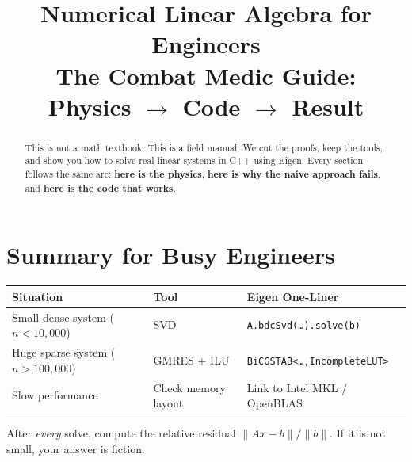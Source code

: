 \documentclass[11pt,letterpaper]{article}
\title{\textbf{Numerical Linear Algebra for Engineers}\\[6pt]
       \large The Combat Medic Guide:\\
       Physics $\rightarrow$ Code $\rightarrow$ Result}
\author{}
\date{}
\theoremstyle{definition}
\theoremstyle{remark}
\begin{document}
\maketitle
\thispagestyle{empty}

\begin{abstract}
This is not a math textbook. This is a field manual. We cut the proofs, keep the
tools, and show you how to solve real linear systems in C++ using Eigen. Every
section follows the same arc: \textbf{here is the physics}, \textbf{here is why
the naive approach fails}, and \textbf{here is the code that works}.
\end{abstract}

\tableofcontents
\newpage









\section{Summary for Busy Engineers}

\begin{center}
\renewcommand{\arraystretch}{1.4}
\begin{tabular}{@{}lll@{}}
\toprule
\textbf{Situation} & \textbf{Tool} & \textbf{Eigen One-Liner} \\
\midrule
Small dense system ($n < 10{,}000$)
    & SVD
    & \texttt{A.bdcSvd(\ldots).solve(b)} \\
Huge sparse system ($n > 100{,}000$)
    & GMRES + ILU
    & \texttt{BiCGSTAB<\ldots,IncompleteLUT>} \\
Slow performance
    & Check memory layout
    & Link to Intel MKL / OpenBLAS \\
\bottomrule
\end{tabular}
\end{center}

\begin{tipbox}
After \emph{every} solve, compute the relative residual
$\|Ax - b\| / \|b\|$. If it is not small, your answer is fiction.
\end{tipbox}
\end{document}
